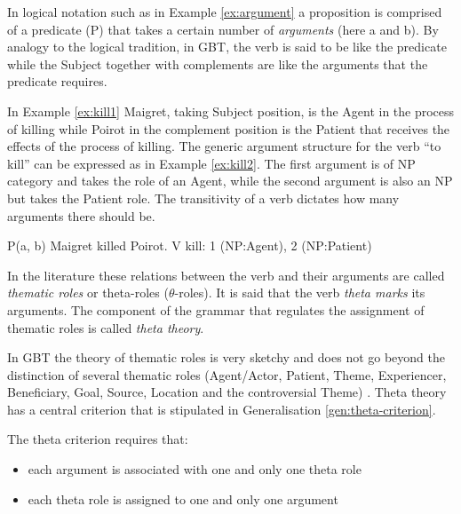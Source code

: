     In logical notation such as in Example \ref{ex:argument} a proposition is comprised of a predicate (P) that takes a certain number of \textit{arguments} (here a and b). By analogy to the logical tradition, in GBT, the verb is said to be like the predicate while the Subject together with complements are like the arguments that the predicate requires. 

    In Example \ref{ex:kill1} Maigret, taking Subject position, is the Agent in the process of killing while Poirot in the complement position is the Patient that receives the effects of the process of killing. The generic argument structure for the verb ``to kill'' can be expressed as in Example \ref{ex:kill2}. The first argument is of NP category and takes the role of an Agent, while the second argument is also an NP but takes the Patient role. The transitivity of a verb dictates how many arguments there should be.

    \begin{exe}
        \ex\label{ex:argument} P(a, b)
        \ex\label{ex:kill1} Maigret killed Poirot.
        \ex\label{ex:kill2} V kill: 1 (NP:Agent), 2 (NP:Patient)
    \end{exe}

    In the literature these relations between the verb and their arguments are called \textit{thematic roles} or theta-roles ($\theta$-roles). It is said that the verb \textit{theta marks} its arguments. The component of the grammar that regulates the assignment of thematic roles is called \textit{theta theory}. 

    In GBT the theory of thematic roles is very sketchy and does not go beyond the distinction of several thematic roles (Agent/Actor, Patient, Theme, Experiencer, Beneficiary, Goal, Source, Location and the controversial Theme) \citep[50]{Haegeman1991}. Theta theory has a central criterion that is stipulated in Generalisation \ref{gen:theta-criterion}.

    \begin{generalization}\label{gen:theta-criterion}
        The theta criterion requires that: 
        \begin{itemize}
            \item each argument is associated with one and only one theta role
            \item each theta role is assigned to one and only one argument \citep[54]{Haegeman1991}
        \end{itemize} 
    \end{generalization}

